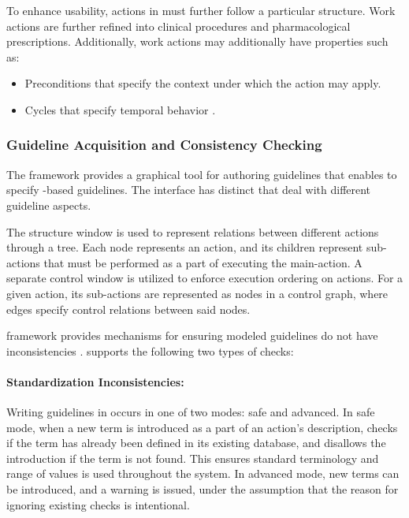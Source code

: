 To enhance usability, actions in \GLARE{} must further follow a particular
structure. Work actions are further refined into clinical procedures and
pharmacological prescriptions. Additionally, work actions may additionally
have properties such as:
\begin{itemize}
  \item Preconditions that specify the context under which the action may apply.
  \item Cycles that specify temporal behavior \cite{TerenzianiAIM01}.
\end{itemize}

\subsubsection{Guideline Acquisition and Consistency Checking}

The \GLARE{} framework provides a graphical tool for authoring guidelines
that enables \HCPs{} to specify \GLARE{}-based guidelines.
The interface has distinct  that deal with different guideline
aspects.

The structure window is used to represent relations
between different actions through a tree. Each node represents
an action, and its children represent sub-actions that must be performed
as a part of executing the main-action.
A separate control window is utilized to enforce execution
ordering on actions. For a given action, its sub-actions
are represented as nodes in a control graph, where edges
specify control relations between said nodes.

\GLARE{} framework provides mechanisms for ensuring modeled
guidelines do not have inconsistencies \cite{TerenzianiAIM01}. \GLARE{} supports the
following two types of checks:

\paragraph{Standardization Inconsistencies:}

Writing guidelines in \GLARE{} occurs in one of two modes: safe and
advanced. In safe mode, when a new term is introduced as a part of
an action's description, \GLARE{} checks if the term has already been
defined in its existing database, and disallows the introduction if
the term is not found. This ensures standard terminology and range of values
is used throughout the system. In advanced mode, new terms can be introduced,
and a warning is issued, under the assumption that the reason for ignoring
existing checks is intentional.

